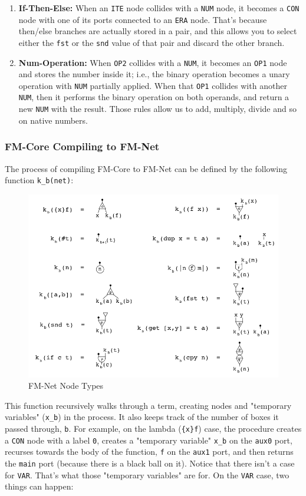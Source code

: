 \documentclass{article}
\theoremstyle{definition}
\theoremstyle{theorem}
\begin{document}
\begin{enumerate}
  \item \textbf{If-Then-Else:} When an \verb|ITE| node collides with a
  \verb|NUM| node, it becomes a \verb|CON| node with one of its ports connected
  to an \verb|ERA| node. That's because then/else branches are actually stored
  in a pair, and this allows you to select either the \verb|fst| or the
  \verb|snd| value of that pair and discard the other branch.

  \item \textbf{Num-Operation:} When \verb|OP2| collides with a \verb|NUM|, it
  becomes an \verb|OP1| node and stores the number inside it; i.e., the binary
  operation becomes a unary operation with \verb|NUM| partially applied. When
  that \verb|OP1| collides with another \verb|NUM|, then it performs the binary
  operation on both operands, and return a new \verb|NUM| with the result.
  Those rules allow us to add, multiply, divide and so on native numbers.
\end{enumerate}

\subsubsection{FM-Core Compiling to FM-Net}

The process of compiling FM-Core to FM-Net can be defined by the following
function \verb|k_b(net)|:

\begin{figure}[H]
  \includegraphics[width=\linewidth]{fm-net-compilation.png}
  \caption{FM-Net Node Types}
\end{figure}

This function recursively walks through a term, creating nodes and "temporary
variables" (\verb|x_b|) in the process. It also keeps track of the number of
boxes it passed through, \verb|b|. For example, on the lambda (\verb|{x}f|)
case, the procedure creates a \verb|CON| node with a label \verb|0|, creates a
"temporary variable" \verb|x_b| on the \verb|aux0| port, recurses towards the
body of the function, \verb|f| on the \verb|aux1| port, and then returns the
\verb|main| port (because there is a black ball on it).  Notice that there isn't
a case for \verb|VAR|. That's what those "temporary variables" are for. On the
\verb|VAR| case, two things can happen:
\end{document}

